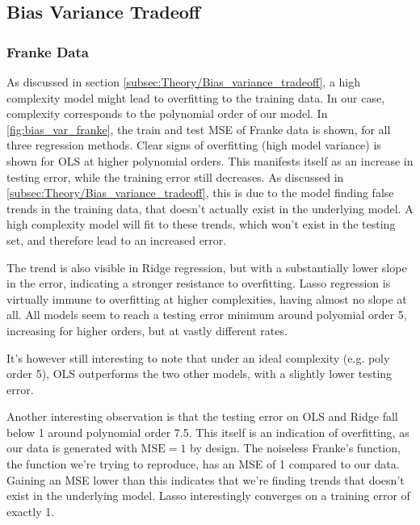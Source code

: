 \documentclass[10pt, twocolumn]{article}
\begin{document}
\subsection{Bias Variance Tradeoff}
\subsubsection{Franke Data}
As discussed in section \cref{subsec:Theory/Bias_variance_tradeoff}, a high complexity model might lead to overfitting to the training data. In our case, complexity corresponds to the polynomial order of our model. In \cref{fig:bias_var_franke}, the train and test MSE of Franke data is shown, for all three regression methods. Clear signs of overfitting (high model variance) is shown for OLS at higher polynomial orders. This manifests itself as an increase in testing error, while the training error still decreases. As discussed in \cref{subsec:Theory/Bias_variance_tradeoff}, this is due to the model finding false trends in the training data, that doesn't actually exist in the underlying model. A high complexity model will fit to these trends, which won't exist in the testing set, and therefore lead to an increased error.

The trend is also visible in Ridge regression, but with a substantially lower slope in the error, indicating a stronger resistance to overfitting. Lasso regression is virtually immune to overfitting at higher complexities, having almost no slope at all. All models seem to reach a testing error minimum around polyomial order 5, increasing for higher orders, but at vastly different rates.

It's however still interesting to note that under an ideal complexity (e.g. poly order 5), OLS outperforms the two other models, with a slightly lower testing error.

Another interesting observation is that the testing error on OLS and Ridge fall below 1 around polynomial order 7.5. This itself is an indication of overfitting, as our data is generated with $\mathrm{MSE} = 1$ by design. The noiseless Franke's function, the function we're trying to reproduce, has an MSE of 1 compared to our data. Gaining an MSE lower than this indicates that we're finding trends that doesn't exist in the underlying model. Lasso interestingly converges on a training error of exactly 1.
\end{document}
